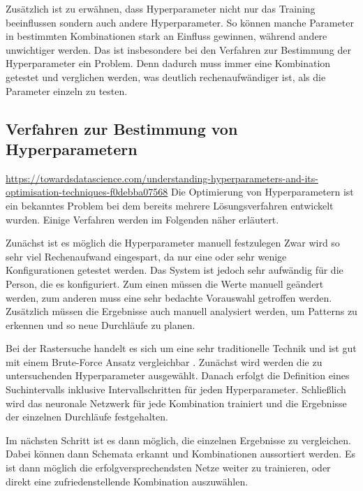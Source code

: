 Zusätzlich ist zu erwähnen, dass Hyperparameter nicht nur das Training beeinflussen sondern auch andere Hyperparameter. 
So können manche Parameter in bestimmten Kombinationen stark an Einfluss gewinnen, während andere unwichtiger werden.
Das ist insbesondere bei den Verfahren zur Bestimmung der Hyperparameter ein Problem.
Denn dadurch muss immer eine Kombination getestet und verglichen werden, was deutlich rechenaufwändiger ist, als die Parameter einzeln zu testen.


\subsection{Verfahren zur Bestimmung von Hyperparametern}
\url{https://towardsdatascience.com/understanding-hyperparameters-and-its-optimisation-techniques-f0debba07568}
Die Optimierung von Hyperparametern ist ein bekanntes Problem bei dem bereits mehrere Lösungsverfahren entwickelt wurden.
Einige Verfahren werden im Folgenden näher erläutert.

Zunächst ist es möglich die Hyperparameter manuell festzulegen 
Zwar wird so sehr viel Rechenaufwand eingespart, da nur eine oder sehr wenige Konfigurationen getestet werden.
Das System ist jedoch sehr aufwändig für die Person, die es konfiguriert.
Zum einen müssen die Werte manuell geändert werden, zum anderen muss eine sehr bedachte Vorauswahl getroffen werden.
Zusätzlich müssen die Ergebnisse auch manuell analysiert werden, um Patterns zu erkennen und so neue Durchläufe zu planen.

Bei der Rastersuche handelt es sich um eine sehr traditionelle Technik und ist gut mit einem Brute-Force Ansatz vergleichbar \cite{hyperparameters-grid-search}.
Zunächst wird werden die zu untersuchenden Hyperparameter ausgewählt.
Danach erfolgt die Definition eines Suchintervalls inklusive Intervallschritten für jeden Hyperparameter.
Schließlich wird das neuronale Netzwerk für jede Kombination trainiert und die Ergebnisse der einzelnen Durchläufe festgehalten.
\newline

Im nächsten Schritt ist es dann möglich, die einzelnen Ergebnisse zu vergleichen.
Dabei können dann Schemata erkannt und Kombinationen aussortiert werden.
Es ist dann möglich die erfolgversprechendsten Netze weiter zu trainieren, oder direkt eine zufriedenstellende Kombination auszuwählen.
\newline

